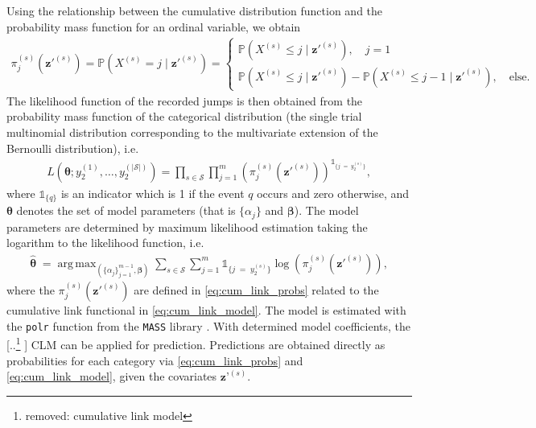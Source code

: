\documentclass{article}
\DeclareMathOperator*{\argmax}{arg\,max}
\providecommand{\DIFadd}[1]{{\protect\color{blue} \sf #1}} %
\providecommand{\DIFdel}[1]{{\protect\color{red} [..\footnote{removed: #1} ]}} %
\providecommand{\DIFaddbegin}{} %
\providecommand{\DIFaddend}{} %
\providecommand{\DIFdelbegin}{} %
\providecommand{\DIFdelend}{} %
\begin{document}
Using the relationship between the cumulative distribution function and the probability mass function for an ordinal variable, we obtain
\begin{align}
     \pi^{(s)}_j\left(\bm{z}'^{(s)}\right) = 
     \mathds{P}\left( X^{(s)} = j \; \vert \; \bm{z}'^{(s)} \right) = 
    \begin{cases}
    \mathds{P}\left( X^{(s)} \leq j \; \vert \; \bm{z}'^{(s)} \right), \quad j = 1 \\
     \mathds{P}\left( X^{(s)} \leq j \; \vert \; \bm{z}'^{(s)} \right) - \mathds{P}\left( X^{(s)} \leq j -1 \; \vert \; \bm{z}'^{(s)} \right), \quad \text{else}.   
    \end{cases} \label{eq:cum_link_probs}
\end{align}
The likelihood function of the recorded jumps is then obtained from the probability mass function of the categorical distribution (the single trial multinomial distribution corresponding to the multivariate extension of the Bernoulli distribution), i.e.
\begin{equation*}
\begin{aligned}
     L\left( \bm{\theta}; y_2^{(1)}, \dots, y_2^{(|\mathcal{S}|)} \right) = \prod_{s \in \mathcal{S}} \prod_{j = 1}^m \left( \pi^{(s)}_j\left(\bm{z}'^{(s)}\right) \right)^{\mathds{1}_{ \{ j \; = \; y_2^{(s)}  \} }}, 
\end{aligned} \label{eq:likelihood_cumlink}
\end{equation*}
where $\mathds{1}_{ \{ q \} }$ is an indicator which is 1 if the event $q$ occurs and zero otherwise, and $\bm{\theta}$ denotes the set of model parameters (that is $\{\alpha_j\}$ and $\bm{\beta}$). The model parameters are determined by maximum likelihood estimation taking the logarithm to the likelihood function, i.e.
\begin{align*}
   \widehat{\pmb{\theta}}  \; = \argmax_{\left( \{ \alpha_{j} \}_{j = 1}^{m-1}, \bm{\beta} \right)} \sum_{s \in \mathcal{S}} \sum_{j = 1}^m 
   \mathds{1}_{ \{ j \; = \; y_2^{(s)} \} } \log\left( \pi^{(s)}_j\left(\bm{z}'^{(s)}\right) \right), 
\end{align*}
where the $\pi^{(s)}_j\left(\bm{z}'^{(s)}\right)$ are defined in \cref{eq:cum_link_probs} related to the cumulative link functional in \cref{eq:cum_link_model}.
The model is estimated with the \texttt{polr} function from the \texttt{MASS} library \citep{mass_R}.
With determined model coefficients, the \DIFdelbegin \DIFdel{cumulative link model }\DIFdelend \DIFaddbegin \DIFadd{CLM }\DIFaddend can be applied for prediction. 
Predictions are obtained directly as probabilities for each category via \cref{eq:cum_link_probs} and \cref{eq:cum_link_model}, given the covariates $\bm{z}’^{(s)}$.
\end{document}
